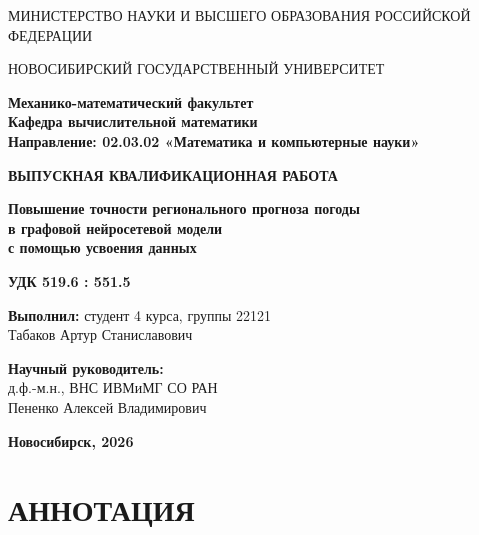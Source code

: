 \documentclass[14pt,a4paper]{extarticle}
\author{}
\date{}
\numberwithin{table}{section}
\numberwithin{figure}{section}
\numberwithin{equation}{section}
\begin{document}
\thispagestyle{empty}
\begin{center}

МИНИСТЕРСТВО НАУКИ И ВЫСШЕГО ОБРАЗОВАНИЯ РОССИЙСКОЙ ФЕДЕРАЦИИ

\vspace{0.5em}

НОВОСИБИРСКИЙ ГОСУДАРСТВЕННЫЙ УНИВЕРСИТЕТ

\vspace{0.5em}

\textbf{Механико-математический факультет}\\
\textbf{Кафедра вычислительной математики}\\
\textbf{Направление: 02.03.02 «Математика и компьютерные науки»}

\vspace{3cm}

{\Large\textbf{ВЫПУСКНАЯ КВАЛИФИКАЦИОННАЯ РАБОТА}}

\vspace{1cm}

{\large\textbf{Повышение точности регионального прогноза погоды\\
в графовой нейросетевой модели\\
с помощью усвоения данных}}

\vspace{0.5cm}

\textbf{УДК 519.6 : 551.5}

\end{center}

\vspace{2cm}

\noindent
\textbf{Выполнил:} студент 4 курса, группы 22121\\
Табаков Артур Станиславович

\vspace{1em}

\noindent
\textbf{Научный руководитель:}\\
д.ф.-м.н., ВНС ИВМиМГ СО РАН\\
Пененко Алексей Владимирович

\vfill

\begin{center}
\textbf{Новосибирск, 2026}
\end{center}

\newpage

\section*{АННОТАЦИЯ}\label{ux430ux43dux43dux43eux442ux430ux446ux438ux44f}
\end{document}
